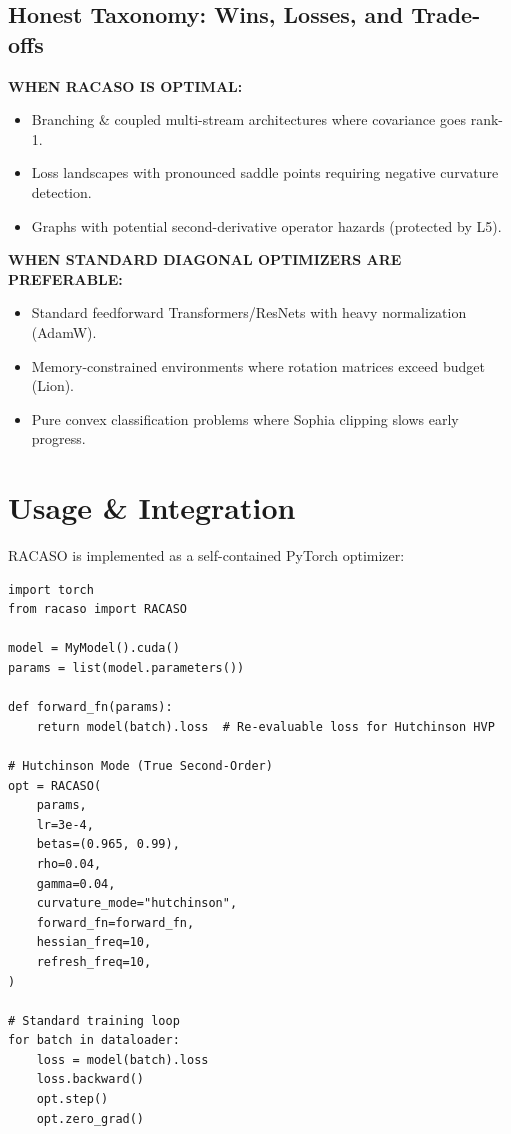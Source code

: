 \documentclass[11pt,a4paper]{article}
\begin{document}
\subsection{Honest Taxonomy: Wins, Losses, and Trade-offs}

\begin{tcolorbox}[title=\textbf{RACASO Applicability Matrix}]
\textbf{WHEN RACASO IS OPTIMAL:}
\begin{itemize}
    \item Branching \& coupled multi-stream architectures where covariance goes rank-1.
    \item Loss landscapes with pronounced saddle points requiring negative curvature detection.
    \item Graphs with potential second-derivative operator hazards (protected by L5).
\end{itemize}
\textbf{WHEN STANDARD DIAGONAL OPTIMIZERS ARE PREFERABLE:}
\begin{itemize}
    \item Standard feedforward Transformers/ResNets with heavy normalization (AdamW).
    \item Memory-constrained environments where rotation matrices exceed budget (Lion).
    \item Pure convex classification problems where Sophia clipping slows early progress.
\end{itemize}
\end{tcolorbox}

\section{Usage \& Integration}

RACASO is implemented as a self-contained PyTorch optimizer:

\begin{verbatim}
import torch
from racaso import RACASO

model = MyModel().cuda()
params = list(model.parameters())

def forward_fn(params):
    return model(batch).loss  # Re-evaluable loss for Hutchinson HVP

# Hutchinson Mode (True Second-Order)
opt = RACASO(
    params,
    lr=3e-4,
    betas=(0.965, 0.99),
    rho=0.04,
    gamma=0.04,
    curvature_mode="hutchinson",
    forward_fn=forward_fn,
    hessian_freq=10,
    refresh_freq=10,
)

# Standard training loop
for batch in dataloader:
    loss = model(batch).loss
    loss.backward()
    opt.step()
    opt.zero_grad()
\end{verbatim}
\end{document}

